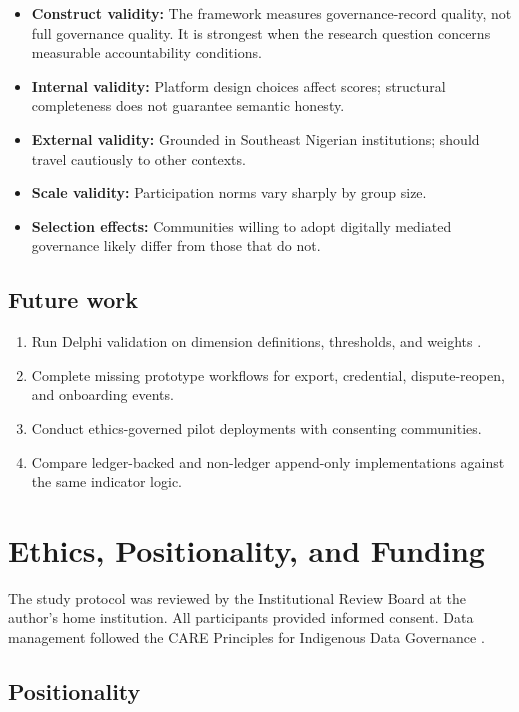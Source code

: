 \documentclass[sigconf]{acmart}
\begin{document}
\begin{itemize}
\item \textbf{Construct validity:} The framework measures governance-record quality, not full governance quality. It is strongest when the research question concerns measurable accountability conditions.
\item \textbf{Internal validity:} Platform design choices affect scores; structural completeness does not guarantee semantic honesty.
\item \textbf{External validity:} Grounded in Southeast Nigerian institutions; should travel cautiously to other contexts.
\item \textbf{Scale validity:} Participation norms vary sharply by group size.
\item \textbf{Selection effects:} Communities willing to adopt digitally mediated governance likely differ from those that do not.
\end{itemize}

\subsection{Future work}

\begin{enumerate}
\item Run Delphi validation on dimension definitions, thresholds, and weights \cite{quyen2014}.
\item Complete missing prototype workflows for export, credential, dispute-reopen, and onboarding events.
\item Conduct ethics-governed pilot deployments with consenting communities.
\item Compare ledger-backed and non-ledger append-only implementations against the same indicator logic.
\end{enumerate}

\section{Ethics, Positionality, and Funding}

The study protocol was reviewed by the Institutional Review Board at the author's home institution. All participants provided informed consent. Data management followed the CARE Principles for Indigenous Data Governance \cite{carroll2020}.

\subsection{Positionality}
\end{document}
